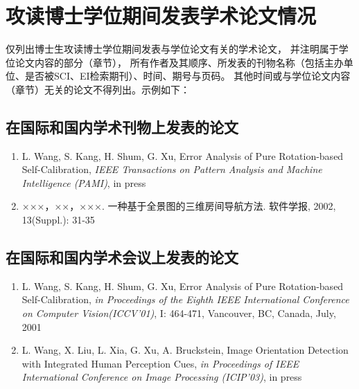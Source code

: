 ﻿%

%
%

\chapter*{\hfill 攻读博士学位期间发表学术论文情况 \hfill}
仅列出博士生攻读博士学位期间发表与学位论文有关的学术论文，
并注明属于学位论文内容的部分（章节），
所有作者及其顺序、所发表的刊物名称（包括主办单位、是否被SCI、EI检索期刊）、时间、期号与页码。
其他时间或与学位论文内容（章节）无关的论文不得列出。示例如下：

\renewcommand{\labelenumi}{[\arabic{enumi}]}
\section*{在国际和国内学术刊物上发表的论文}
\begin{enumerate}
\item L. Wang, S. Kang, H. Shum, G. Xu, Error Analysis of Pure
Rotation-based Self-Calibration, {\em{IEEE Transactions on Pattern
Analysis and Machine Intelligence (PAMI)}}, in press
\item ×××，××，×××. 一种基于全景图的三维房间导航方法.
软件学报, 2002, 13(Suppl.): 31-35
\end{enumerate}

\section*{在国际和国内学术会议上发表的论文}
\begin{enumerate}
\item L. Wang, S. Kang, H. Shum, G. Xu, Error Analysis of Pure
Rotation-based Self-Calibration, {\em{in Proceedings of the Eighth
IEEE International Conference on Computer Vision(ICCV'01)}}, I:
464-471, Vancouver, BC, Canada, July, 2001
\item L. Wang, X. Liu, L. Xia, G. Xu, A. Bruckstein, Image
Orientation Detection with Integrated Human Perception Cues,
{\em{in Proceedings of IEEE International Conference on Image
Processing (ICIP'03)}}, in press
\end{enumerate}

